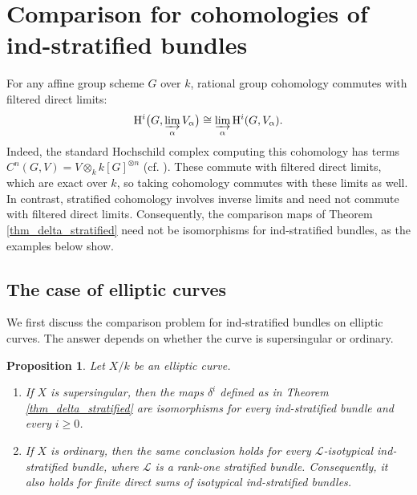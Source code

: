 \documentclass[12pt,a4]{amsart}
\newtheorem{prop}[claim]{Proposition}
\theoremstyle{definition}
\begin{document}
\section{Comparison for cohomologies of ind-stratified bundles}
\label{sect_comparison_ind}
For any affine group scheme $G$ over $k$, rational group cohomology commutes with filtered direct limits:
\[
\mathrm H^i\bigl(G,\varinjlim_\alpha V_\alpha\bigr)
\cong\varinjlim_\alpha\mathrm H^i(G,V_\alpha).
\]
Indeed, the standard Hochschild complex computing this cohomology has terms
$C^n(G,V)=V\otimes_k k[G]^{\otimes n}$ (cf. \cite[Part~I, Chapter~4]{Jan87}).
These commute with filtered direct limits, which are exact over $k$, so taking cohomology commutes with these limits as well.
In contrast, stratified cohomology involves inverse limits and need not commute with filtered direct limits. Consequently, the comparison maps of Theorem \ref{thm_delta_stratified} need not be isomorphisms for ind-stratified bundles, as the examples below show.

\subsection{The case of elliptic curves}
We first discuss the comparison problem for ind-stratified bundles on elliptic curves. The answer depends on whether the curve is supersingular or ordinary.

\begin{prop}\label{prop_elliptic}
Let $X/k$ be an elliptic curve.
\begin{enumerate}
\item If $X$ is supersingular, then the maps $\delta^i$ defined as in Theorem \ref{thm_delta_stratified} are isomorphisms for every ind-stratified bundle and every $i\geq 0$.
\item If $X$ is ordinary, then the same conclusion holds for every $\mathcal L$-isotypical ind-stratified bundle, where $\mathcal L$ is a rank-one stratified bundle. Consequently, it also holds for finite direct sums of isotypical ind-stratified bundles.
\end{enumerate}
\end{prop}
\end{document}

